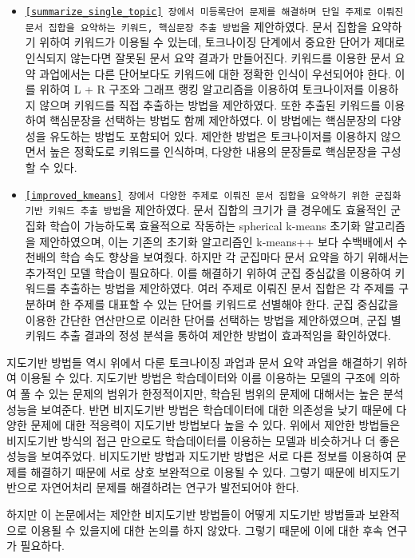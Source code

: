 \documentclass[oneside, ko,phd]{snuthesis_utf8_kor}
\begin{document}
\begin{itemize}
  \item \texttt{\ref{summarize_single_topic} 장에서 미등록단어 문제를 해결하며 단일 주제로 이뤄진 문서 집합을 요약하는 키워드, 핵심문장 추출 방법}을 제안하였다. 문서 집합을 요약하기 위하여 키워드가 이용될 수 있는데, 토크나이징 단계에서 중요한 단어가 제대로 인식되지 않는다면 잘못된 문서 요약 결과가 만들어진다. 키워드를 이용한 문서 요약 과업에서는 다른 단어보다도 키워드에 대한 정확한 인식이 우선되어야 한다. 이를 위하여 L + R 구조와 그래프 랭킹 알고리즘을 이용하여 토크나이저를 이용하지 않으며 키워드를 직접 추출하는 방법을 제안하였다. 또한 추출된 키워드를 이용하여 핵심문장을 선택하는 방법도 함께 제안하였다. 이 방법에는 핵심문장의 다양성을 유도하는 방법도 포함되어 있다. 제안한 방법은 토크나이저를 이용하지 않으면서 높은 정확도로 키워드를 인식하며, 다양한 내용의 문장들로 핵심문장을 구성할 수 있다.
  \item \texttt{\ref{improved_kmeans} 장에서 다양한 주제로 이뤄진 문서 집합을 요약하기 위한 군집화 기반 키워드 추출 방법}을 제안하였다. 문서 집합의 크기가 클 경우에도 효율적인 군집화 학습이 가능하도록 효율적으로 작동하는 spherical k-means 초기화 알고리즘을 제안하였으며, 이는 기존의 초기화 알고리즘인 k-means++ 보다 수백배에서 수천배의 학습 속도 향상을 보여줬다. 하지만 각 군집마다 문서 요약을 하기 위해서는 추가적인 모델 학습이 필요하다. 이를 해결하기 위하여 군집 중심값을 이용하여 키워드를 추출하는 방법을 제안하였다. 여러 주제로 이뤄진 문서 집합은 각 주제를 구분하며 한 주제를 대표할 수 있는 단어를 키워드로 선별해야 한다. 군집 중심값을 이용한 간단한 연산만으로 이러한 단어를 선택하는 방법을 제안하였으며, 군집 별 키워드 추출 결과의 정성 분석을 통하여 제안한 방법이 효과적임을 확인하였다.
\end{itemize}

지도기반 방법들 역시 위에서 다룬 토크나이징 과업과 문서 요약 과업을 해결하기 위하여 이용될 수 있다.
지도기반 방법은 학습데이터와 이를 이용하는 모델의 구조에 의하여 풀 수 있는 문제의 범위가 한정적이지만, 학습된 범위의 문제에 대해서는 높은 분석 성능을 보여준다.
반면 비지도기반 방법은 학습데이터에 대한 의존성을 낮기 때문에 다양한 문제에 대한 적응력이 지도기반 방법보다 높을 수 있다.
위에서 제안한 방법들은 비지도기반 방식의 접근 만으로도 학습데이터를 이용하는 모델과 비슷하거나 더 좋은 성능을 보여주었다.
비지도기반 방법과 지도기반 방법은 서로 다른 정보를 이용하여 문제를 해결하기 때문에 서로 상호 보완적으로 이용될 수 있다.
그렇기 때문에 비지도기반으로 자연어처리 문제를 해결하려는 연구가 발전되어야 한다.

하지만 이 논문에서는 제안한 비지도기반 방법들이 어떻게 지도기반 방법들과 보완적으로 이용될 수 있을지에 대한 논의를 하지 않았다.
그렇기 때문에 이에 대한 후속 연구가 필요하다.
\end{document}
